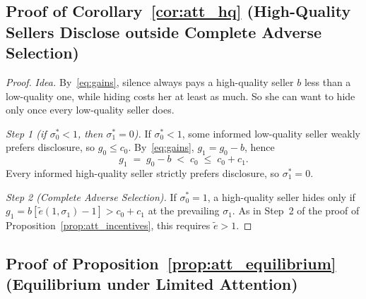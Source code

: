 \subsection*{Proof of Corollary~\ref{cor:att_hq} (High-Quality Sellers Disclose outside Complete Adverse Selection)}

\begin{proof}\upshape
\emph{Idea.} By~\eqref{eq:gains}, silence always pays a high-quality seller $b$ less than a low-quality one, while hiding costs her at least as much. So she can want to hide only once every low-quality seller does.

\emph{Step 1 (if $\sigma_0^*<1$, then $\sigma_1^*=0$).} If $\sigma_0^*<1$, some informed low-quality seller weakly prefers disclosure, so $g_0\le c_0$. By~\eqref{eq:gains}, $g_1=g_0-b$, hence
\begin{equation*}
    g_1\;=\;g_0-b\;<\;c_0\;\le\;c_0+c_1.
\end{equation*}
Every informed high-quality seller strictly prefers disclosure, so $\sigma_1^*=0$.

\emph{Step 2 (Complete Adverse Selection).} If $\sigma_0^*=1$, a high-quality seller hides only if $g_1=b[\tilde e(1,\sigma_1)-1]>c_0+c_1$ at the prevailing $\sigma_1$. As in Step~2 of the proof of Proposition~\ref{prop:att_incentives}, this requires $\tilde e>1$.
\end{proof}

\subsection*{Proof of Proposition~\ref{prop:att_equilibrium} (Equilibrium under Limited Attention)}

